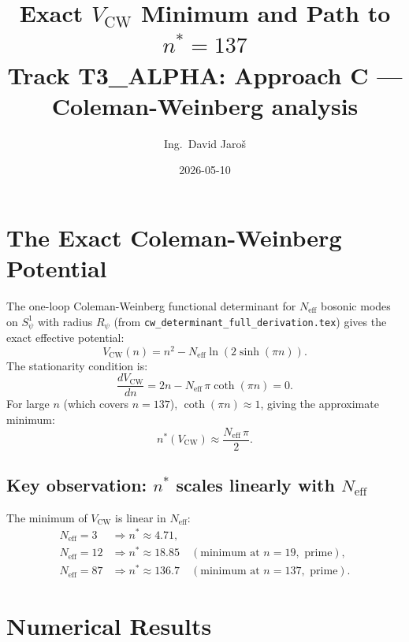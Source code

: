 \documentclass[12pt,a4paper]{article}
\title{\textbf{Exact $V_{\mathrm{CW}}$ Minimum and Path to $n^*=137$}\\[4pt]
         \large Track T3\_ALPHA: Approach C --- Coleman-Weinberg analysis}
\author{Ing.\ David Jaro\v{s}}
\date{2026-05-10}
\theoremstyle{definition}
\theoremstyle{remark}
\newcommand{\Neff}{N_{\mathrm{eff}}}
\newcommand{\VCW}{V_{\mathrm{CW}}}
\begin{document}
  \maketitle
\fi

\section{The Exact Coleman-Weinberg Potential}
\label{sec:vcw:exact}

The one-loop Coleman-Weinberg functional determinant for $\Neff$ bosonic modes
on $S^1_\psi$ with radius $R_\psi$ (from
\texttt{cw\_determinant\_full\_derivation.tex}) gives the exact effective potential:
\begin{equation}
  \VCW(n) = n^2 - \Neff\ln\!\left(2\sinh(\pi n)\right) .
  \label{eq:VCW}
\end{equation}
The stationarity condition is:
\begin{equation}
  \frac{d\VCW}{dn} = 2n - \Neff\,\pi\coth(\pi n) = 0 .
  \label{eq:stationarity}
\end{equation}
For large $n$ (which covers $n=137$), $\coth(\pi n) \approx 1$, giving the
approximate minimum:
\begin{equation}
  n^*(\VCW) \approx \frac{\Neff\,\pi}{2} .
  \label{eq:nstar_approx}
\end{equation}

\subsection{Key observation: $n^*$ scales linearly with $\Neff$}

The minimum of $\VCW$ is linear in $\Neff$:
\begin{align}
  \Neff = 3 &\Rightarrow n^* \approx 4.71 , \\
  \Neff = 12 &\Rightarrow n^* \approx 18.85 \quad (\text{minimum at } n=19, \text{ prime}) , \\
  \Neff = 87 &\Rightarrow n^* \approx 136.7 \quad (\text{minimum at } n=137, \text{ prime}) .
\end{align}

\section{Numerical Results}
\label{sec:vcw:numerical}
\end{document}
